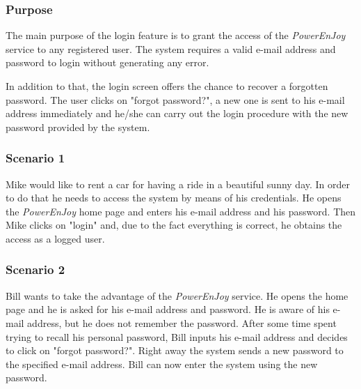\subsubsection{Purpose}
The main purpose of the login feature is to grant the access of the \emph{PowerEnJoy} service to any registered user. The system requires a valid e-mail address and password to login without generating any error.

In addition to that, the login screen offers the chance to recover a forgotten password. The user clicks on "forgot password?", a new one is sent to his e-mail address immediately and he/she can carry out the login procedure with the new password provided by the system.

\subsubsection{Scenario 1}
Mike would like to rent a car for having a ride in a beautiful sunny day. In order to do that he needs to access the system by means of his credentials. He opens the \emph{PowerEnJoy} home page and enters his e-mail address and his password. Then Mike clicks on "login" and, due to the fact everything is correct, he obtains the access as a logged user.

\subsubsection{Scenario 2}
Bill wants to take the advantage of the \emph{PowerEnJoy} service. He opens the home page and he is asked for his e-mail address and password. He is aware of his e-mail address, but he does not remember the password. After some time spent trying to recall his personal password, Bill inputs his e-mail address and decides to click on "forgot password?". Right away the system sends a new password to the specified e-mail address. Bill can now enter the system using the new password.


